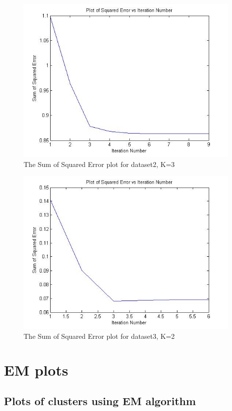 \documentclass[11pt,psfig]{article}
\begin{document}
\begin{figure}[H]
\centering
\includegraphics[height=3.25in]{dataset2_kMeans_squaredErrorPlot.jpg}
\caption{The Sum of Squared Error plot for dataset2, K=3}
\end{figure}

\begin{figure}[H]
\centering
\includegraphics[height=3.25in]{dataset3_kMeans_squaredErrorPlot.jpg}
\caption{The Sum of Squared Error plot for dataset3, K=2}
\end{figure}

\section*{EM plots}

\subsection*{Plots of clusters using EM algorithm}
\end{document}
